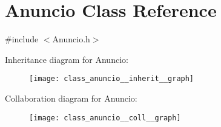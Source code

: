 \hypertarget{class_anuncio}{\section{Anuncio Class Reference}
\label{class_anuncio}
}


{\ttfamily \#include $<$Anuncio.\+h$>$}



Inheritance diagram for Anuncio\+:\nopagebreak
\begin{figure}[H]
\begin{center}
\leavevmode
\texttt{[image: class\_anuncio\_\_inherit\_\_graph]}
\end{center}
\end{figure}


Collaboration diagram for Anuncio\+:\nopagebreak
\begin{figure}[H]
\begin{center}
\leavevmode
\texttt{[image: class\_anuncio\_\_coll\_\_graph]}
\end{center}
\end{figure}
